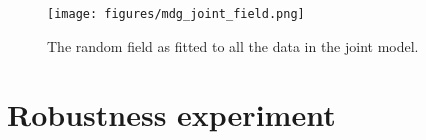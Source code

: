 \documentclass[10pt,a4]{article}
\begin{document}
\begin{figure}[h!]
\centering

\texttt{[image: figures/mdg\_joint\_field.png]}

\caption{The random field as fitted to all the data in the joint model.}
\label{jointfieldidn}
\end{figure}



\section{Robustness experiment}


\begin{table}
\caption{\label{table1}Summary of out-of-sample accuracy for all cross-validation, robustness experiments.
For each fold, one data point in the training set is changed to either 5 times or $\frac{1}{5}$ times its original value.
All test data is kept the same. 
Mean absolute error of predicted incidence rate against out-of-sample observed data for three countries. 
Results that are significantly better or worse than the baseline (at the 95\% significance level) are indicated with a dagger.
}
\centering
{}
\end{table}
\end{document}
